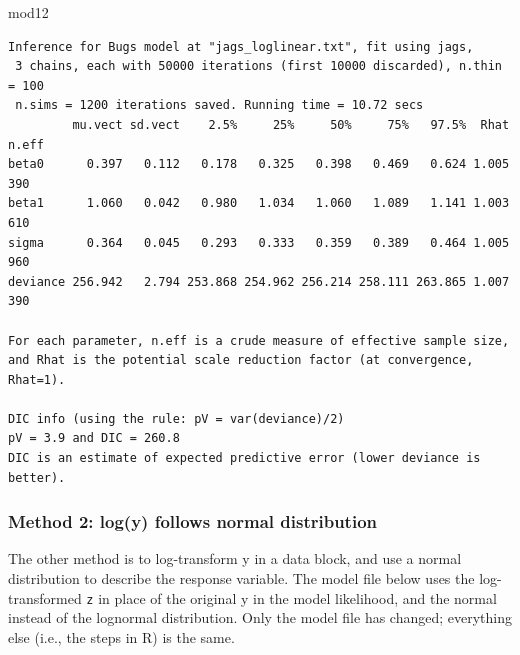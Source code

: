 \documentclass[
  13,
  letterpaper,
]{report}
\newenvironment{Shaded}{\begin{snugshade}}{\end{snugshade}}
\newcommand{\NormalTok}[1]{\textcolor[rgb]{0.00,0.23,0.31}{#1}}
\begin{document}
\begin{Shaded}
\begin{Highlighting}[]
\NormalTok{mod12}
\end{Highlighting}
\end{Shaded}

\begin{verbatim}
Inference for Bugs model at "jags_loglinear.txt", fit using jags,
 3 chains, each with 50000 iterations (first 10000 discarded), n.thin = 100
 n.sims = 1200 iterations saved. Running time = 10.72 secs
         mu.vect sd.vect    2.5%     25%     50%     75%   97.5%  Rhat n.eff
beta0      0.397   0.112   0.178   0.325   0.398   0.469   0.624 1.005   390
beta1      1.060   0.042   0.980   1.034   1.060   1.089   1.141 1.003   610
sigma      0.364   0.045   0.293   0.333   0.359   0.389   0.464 1.005   960
deviance 256.942   2.794 253.868 254.962 256.214 258.111 263.865 1.007   390

For each parameter, n.eff is a crude measure of effective sample size,
and Rhat is the potential scale reduction factor (at convergence, Rhat=1).

DIC info (using the rule: pV = var(deviance)/2)
pV = 3.9 and DIC = 260.8
DIC is an estimate of expected predictive error (lower deviance is better).
\end{verbatim}

\subsubsection{Method 2: log(y) follows normal
distribution}\label{method-2-logy-follows-normal-distribution}

The other method is to log-transform y in a data block, and use a normal
distribution to describe the response variable. The model file below
uses the log-transformed \texttt{z} in place of the original y in the
model likelihood, and the normal instead of the lognormal distribution.
Only the model file has changed; everything else (i.e., the steps in R)
is the same.
\end{document}
